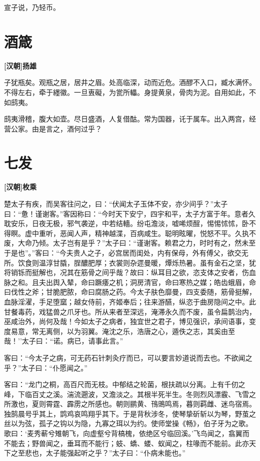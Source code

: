 \documentclass[UTF8,titlepage,oneside]{ctexbook}
\begin{document}
宣子说，乃轻币。



\chapter*{酒箴}
\begin{center}
	\textbf{[汉朝]扬雄}
\end{center}

子犹瓶矣。观瓶之居，居井之眉。处高临深，动而近危。酒醪不入口，臧水满怀。不得左右，牵于纆徽。一旦叀礙，为瓽所轠。身提黄泉，骨肉为泥。自用如此，不如鸱夷。

鸱夷滑稽，腹大如壶。尽日盛酒，人复借酤。常为国器，讬于属车。出入两宫，经营公家。由是言之，酒何过乎？ 


\chapter*{七发}
\begin{center}
	\textbf{[汉朝]枚乘}
\end{center}


楚太子有疾，而吴客往问之，曰：“伏闻太子玉体不安，亦少间乎？”太子曰：“惫！谨谢客。”客因称曰：“今时天下安宁，四宇和平，太子方富于年。意者久耽安乐，日夜无极，邪气袭逆，中若结轖。纷屯澹淡，嘘唏烦酲，惕惕怵怵，卧不得瞑。虚中重听，恶闻人声，精神越渫，百病咸生。聪明眩曜，悦怒不平。久执不废，大命乃倾。太子岂有是乎？”太子曰：“谨谢客。赖君之力，时时有之，然未至于是也”。”客曰：“今夫贵人之子，必宫居而闺处，内有保母，外有傅父，欲交无所。饮食则温淳甘膬，脭醲肥厚；衣裳则杂遝曼暖，燂烁热暑。虽有金石之坚，犹将销铄而挺解也，况其在筋骨之间乎哉？故曰：纵耳目之欲，恣支体之安者，伤血脉之和。且夫出舆入辇，命曰蹶痿之机；洞房清官，命曰寒热之媒；皓齿蛾眉，命曰伐性之斧；甘脆肥脓，命曰腐肠之药。今太子肤色靡曼，四支委随，筋骨挺解，血脉淫濯，手足堕窳；越女侍前，齐姬奉后；往来游醼，纵恣于曲房隐间之中。此甘餐毒药，戏猛兽之爪牙也。所从来者至深远，淹滞永久而不废，虽令扁鹊治内，巫咸治外，尚何及哉！今如太子之病者，独宜世之君子，博见强识，承间语事，变度易意，常无离侧，以为羽翼。淹沈之乐，浩唐之心，遁佚之志，其奚由至哉！’’太子曰：“诺。病已，请事此言。”


客曰：“今太子之病，可无药石针刺灸疗而已，可以要言妙道说而去也。不欲闻之乎？”太子曰：“仆愿闻之。”


客曰：“龙门之桐，高百尺而无枝。中郁结之轮菌，根扶疏以分离。上有千仞之峰，下临百丈之溪。湍流遡波，又澹淡之。其根半死半生。冬则烈风漂霰、飞雪之所激也，夏则霄霆、霹雳之所感也。朝则鹂黄、鳱鴠鸣焉，暮则羁雌、迷鸟宿焉。独鹄晨号乎其上，鹍鸡哀鸣翔乎其下。于是背秋涉冬，使琴挚斫斩以为琴，野茧之丝以为弦，孤子之钩以为隐，九寡之珥以为约。使师堂操《畅》，伯子牙为之歌。歌曰：‘麦秀蔪兮雉朝飞，向虚壑兮背槁槐，依绝区兮临回溪。’飞鸟闻之，翕翼而不能去；野兽闻之，垂耳而不能行；蚑、蟜、蝼、蚁闻之，柱喙而不能前。此亦天下之至悲也，太子能强起听之乎？”太子曰：“仆病未能也。”
\end{document}
